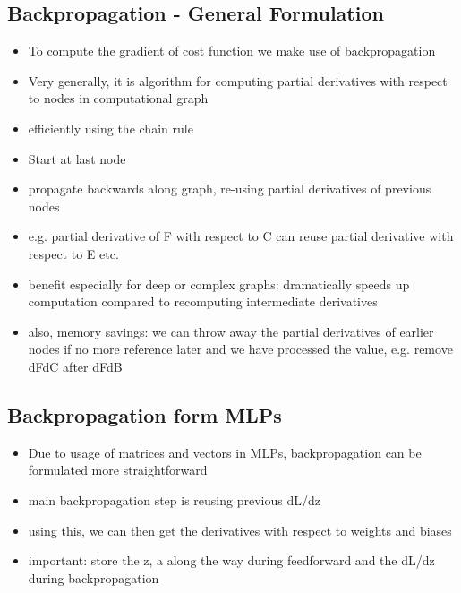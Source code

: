 \documentclass{article}
\begin{document}
\subsection*{Backpropagation - General Formulation}
\begin{itemize}
    \item To compute the gradient of cost function we make use of backpropagation
    \item Very generally, it is algorithm for computing partial derivatives with respect to nodes in computational graph
    \item efficiently using the chain rule
    \item Start at last node
    \item propagate backwards along graph, re-using partial derivatives of previous nodes
    \item e.g. partial derivative of F with respect to C can reuse partial derivative with respect to E etc.
    \item benefit especially for deep or complex graphs: dramatically speeds up computation compared to recomputing intermediate derivatives
    \item also, memory savings: we can throw away the partial derivatives of earlier nodes if no more reference later and we have processed the value, e.g. remove dFdC after dFdB
\end{itemize}

\subsection*{Backpropagation form MLPs}
\begin{itemize}
    \item Due to usage of matrices and vectors in MLPs, backpropagation can be formulated more straightforward
    \item main backpropagation step is reusing previous dL/dz
    \item using this, we can then get the derivatives with respect to weights and biases
    \item important: store the z, a along the way during feedforward and the dL/dz during backpropagation
\end{itemize}
\end{document}

